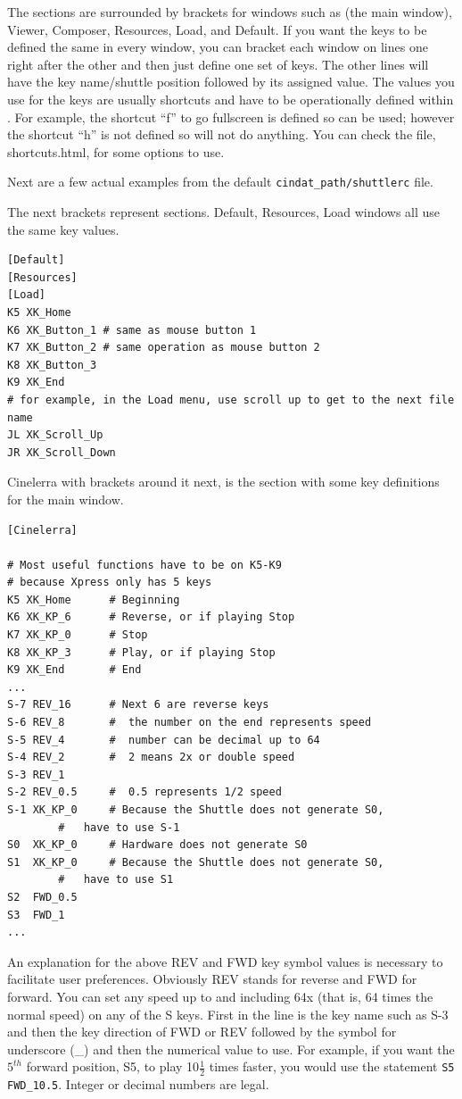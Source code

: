 The sections are surrounded by brackets for windows such as \CGG{}
(the main window), Viewer, Composer, Resources, Load, and Default.
If you want the keys to be defined the same in every window, you can
bracket each window on lines one right after the other and then just
define one set of keys.  The other lines will have the key
name/shuttle position followed by its assigned value.  The values
you use for the keys are usually shortcuts and have to be
operationally defined within \CGG{}. For example, the shortcut “f”
to go fullscreen is defined so can be used; however the shortcut “h”
is not defined so will not do anything.  You can check the file,
shortcuts.html, for some options to use.

Next are a few actual examples from the default
\texttt{{cindat\_path}/shuttlerc} file.

The next brackets represent sections. Default, Resources, Load
windows all use the same key values.

\begin{lstlisting}[style=sh]
[Default]
[Resources]
[Load]
K5 XK_Home
K6 XK_Button_1 # same as mouse button 1
K7 XK_Button_2 # same operation as mouse button 2
K8 XK_Button_3
K9 XK_End
# for example, in the Load menu, use scroll up to get to the next file name
JL XK_Scroll_Up
JR XK_Scroll_Down
\end{lstlisting}

Cinelerra with brackets around it next, is the section with some key
definitions for the main window.

\begin{lstlisting}[style=sh]
[Cinelerra]

# Most useful functions have to be on K5-K9
# because Xpress only has 5 keys
K5 XK_Home      # Beginning
K6 XK_KP_6      # Reverse, or if playing Stop
K7 XK_KP_0      # Stop
K8 XK_KP_3      # Play, or if playing Stop
K9 XK_End       # End
...
S-7 REV_16     	# Next 6 are reverse keys
S-6 REV_8      	#  the number on the end represents speed
S-5 REV_4      	#  number can be decimal up to 64
S-4 REV_2      	#  2 means 2x or double speed
S-3 REV_1
S-2 REV_0.5    	#  0.5 represents 1/2 speed
S-1 XK_KP_0    	# Because the Shuttle does not generate S0,
		#   have to use S-1
S0  XK_KP_0   	# Hardware does not generate S0
S1  XK_KP_0   	# Because the Shuttle does not generate S0,
		#   have to use S1
S2  FWD_0.5
S3  FWD_1
...
\end{lstlisting}

An explanation for the above REV and FWD key symbol values is
necessary to facilitate user preferences.  Obviously REV stands for
reverse and FWD for forward.  You can set any speed up to and
including 64x (that is, 64 times the normal speed) on any of the S
keys.  First in the line is the key name such as S-3 and then the
key direction of FWD or REV followed by the symbol for underscore
(\_) and then the numerical value to use.  For example, if you want
the $5^{th}$ forward position, S5, to play 10$\frac{1}{2}$ times
faster, you would use the statement \texttt{S5 FWD\_10.5}.  Integer
or decimal numbers are legal.

